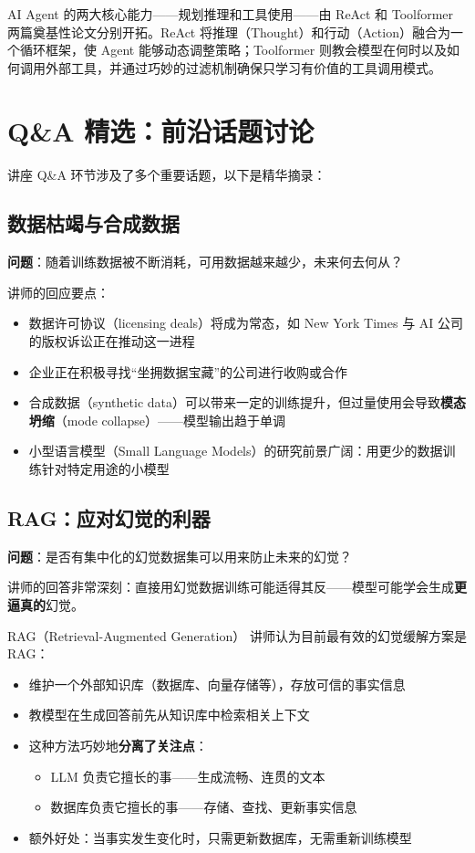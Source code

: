 \documentclass[a4paper]{article}
\begin{document}
AI Agent 的两大核心能力——规划推理和工具使用——由 ReAct 和 Toolformer 两篇奠基性论文分别开拓。ReAct 将推理（Thought）和行动（Action）融合为一个循环框架，使 Agent 能够动态调整策略；Toolformer 则教会模型在何时以及如何调用外部工具，并通过巧妙的过滤机制确保只学习有价值的工具调用模式。

\section{Q\&A 精选：前沿话题讨论}

讲座 Q\&A 环节涉及了多个重要话题，以下是精华摘录：

\subsection{数据枯竭与合成数据}

\textbf{问题}：随着训练数据被不断消耗，可用数据越来越少，未来何去何从？

讲师的回应要点：
\begin{itemize}
    \item 数据许可协议（licensing deals）将成为常态，如 New York Times 与 AI 公司的版权诉讼正在推动这一进程
    \item 企业正在积极寻找``坐拥数据宝藏''的公司进行收购或合作
    \item 合成数据（synthetic data）可以带来一定的训练提升，但过量使用会导致\textbf{模态坍缩}（mode collapse）——模型输出趋于单调
    \item 小型语言模型（Small Language Models）的研究前景广阔：用更少的数据训练针对特定用途的小模型
\end{itemize}

\subsection{RAG：应对幻觉的利器}

\textbf{问题}：是否有集中化的幻觉数据集可以用来防止未来的幻觉？

讲师的回答非常深刻：直接用幻觉数据训练可能适得其反——模型可能学会生成\textbf{更逼真的}幻觉。

\begin{importantbox}{RAG（Retrieval-Augmented Generation）}
讲师认为目前最有效的幻觉缓解方案是 RAG：
\begin{itemize}
    \item 维护一个外部知识库（数据库、向量存储等），存放可信的事实信息
    \item 教模型在生成回答前先从知识库中检索相关上下文
    \item 这种方法巧妙地\textbf{分离了关注点}：
    \begin{itemize}
        \item LLM 负责它擅长的事——生成流畅、连贯的文本
        \item 数据库负责它擅长的事——存储、查找、更新事实信息
    \end{itemize}
    \item 额外好处：当事实发生变化时，只需更新数据库，无需重新训练模型
\end{itemize}
\end{importantbox}
\end{document}
